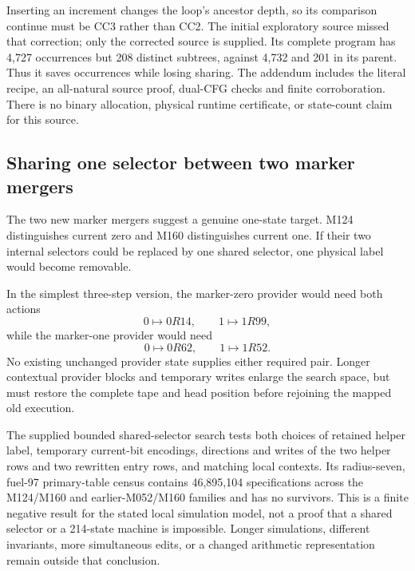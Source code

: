 \documentclass[11pt,a4paper]{article}
\theoremstyle{definition}
\numberwithin{equation}{section}
\begin{document}
Inserting an increment changes the loop's ancestor depth, so its comparison
continue must be CC3 rather than CC2. The initial exploratory source missed
that correction; only the corrected source is supplied. Its complete
program has 4,727 occurrences but 208 distinct subtrees, against 4,732
and 201 in its parent. Thus it saves occurrences while losing sharing.
The addendum includes the literal recipe, an all-natural source proof,
dual-CFG checks and finite corroboration. There is no binary allocation,
physical runtime certificate, or state-count claim for this source.

\subsection{Sharing one selector between two marker mergers}

The two new marker mergers suggest a genuine one-state target. M124
distinguishes current zero and M160 distinguishes current one. If their
two internal selectors could be replaced by one shared selector, one
physical label would become removable.

In the simplest three-step version, the marker-zero provider would need
both actions
\[
 0\mapsto0R14,\qquad1\mapsto1R99,
\]
while the marker-one provider would need
\[
 0\mapsto0R62,\qquad1\mapsto1R52.
\]
No existing unchanged provider state supplies either required pair.
Longer contextual provider blocks and temporary writes enlarge the search
space, but must restore the complete tape and head position before
rejoining the mapped old execution.

The supplied bounded shared-selector search tests both choices of retained
helper label, temporary current-bit encodings, directions and writes of
the two helper rows and two rewritten entry rows, and matching local
contexts. Its radius-seven, fuel-97 primary-table census contains
46,895,104 specifications across the M124/M160 and earlier-M052/M160
families and has no survivors. This is a finite negative result for the
stated local simulation model, not a proof that a shared selector or a
214-state machine is impossible. Longer simulations, different invariants,
more simultaneous edits, or a changed arithmetic representation remain
outside that conclusion.
\end{document}
